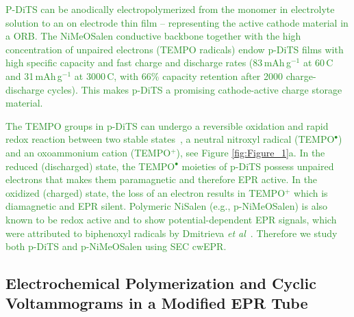 \documentclass{WileyMSP-template}
\newcommand{\np}[1]{\textcolor{ForestGreen}{#1}}
\begin{document}
\np{P-DiTS can be anodically electropolymerized from the monomer in electrolyte solution to an on electrode thin film -- representing the active cathode material in a ORB. The NiMeOSalen conductive backbone together with the high concentration of unpaired electrons (TEMPO radicals) endow p-DiTS films with high specific capacity and fast charge and discharge rates (83$\,$mAh$\,$g$^{-1}$ at 60$\,$C and 31$\,$mAh$\,$g$^{-1}$ at 3000$\,$C, with 66\% capacity retention after 2000 charge-discharge cycles)\cite{vereshchagin2020_battandsupercaps}. This makes p-DiTS a promising cathode-active charge storage material.}

\bigbreak

\np{The TEMPO groups in p-DiTS can undergo a reversible oxidation and rapid redox reaction between two stable states~\cite{vereshchagin2020_battandsupercaps}, a neutral nitroxyl radical (TEMPO$^{\bullet}$) and an oxoammonium cation (TEMPO$^{+}$), see Figure \ref{fig:Figure_1}a. In the reduced (discharged) state, the TEMPO$^{\bullet}$ moieties of p-DiTS possess unpaired electrons that makes them paramagnetic and therefore EPR active. In the oxidized (charged) state, the loss of an electron results in TEMPO$^{+}$ which is diamagnetic and EPR silent. Polymeric NiSalen (e.g., p-NiMeOSalen) is also known to be redox active and to show potential-dependent EPR signals, which were attributed to biphenoxyl radicals by Dmitrieva \textit{et al}~\cite{Dmitrieva2018}. Therefore we study both p-DiTS and p-NiMeOSalen using SEC cwEPR.
}



\bigbreak

\subsection*{Electrochemical Polymerization and Cyclic Voltammograms in a Modified EPR Tube}\label{CVTube}
\end{document}
